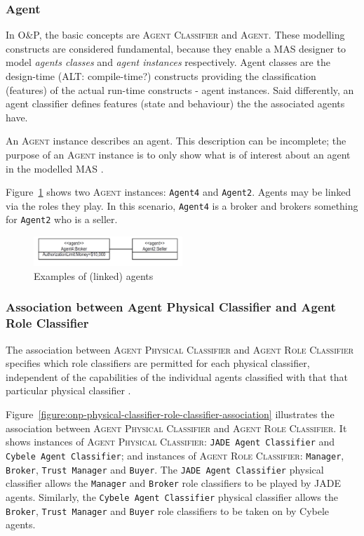 \subsubsection*{Agent}

In O\&P, the basic concepts are \textsc{Agent Classifier} and \textsc{Agent}.
These modelling constructs are considered fundamental, because they enable a MAS designer to model \textit{agents classes} and \textit{agent instances} respectively.
Agent classes are the design-time (ALT: compile-time?) constructs providing the classification (features) of the actual run-time constructs - agent instances.
Said differently, an agent classifier defines features (state and behaviour) the the associated agents have. 

An \textsc{Agent} instance describes an agent.
This description can be incomplete; the purpose of an \textsc{Agent} instance is to only show what is of interest about an agent in the modelled MAS \cite{Odell05}.

Figure~\ref{figure:onp-agent-examples} shows two \textsc{Agent} instances: \texttt{Agent4} and \texttt{Agent2}.
Agents may be linked via the roles they play.
In this scenario, \texttt{Agent4} is a broker and brokers something for \texttt{Agent2} who is a seller.

\begin{figure}[h]
	\centering
	\includegraphics[width=0.5\textwidth]{images/onp-agent-examples.png}
	\caption{Examples of (linked) agents}
	\label{figure:onp-agent-examples}
\end{figure}

\subsubsection*{Association between Agent Physical Classifier and Agent Role Classifier}

The association between \textsc{Agent Physical Classifier} and \textsc{Agent Role Classifier} specifies which role classifiers are permitted for each physical classifier, independent of the capabilities of the individual agents classified with that that particular physical classifier \cite{Odell05}.

Figure~\ref{figure:onp-physical-classifier-role-classifier-association} illustrates the association between \textsc{Agent Physical Classifier} and \textsc{Agent Role Classifier}. It shows instances of \textsc{Agent Physical Classifier}: \texttt{JADE Agent Classifier} and \texttt{Cybele Agent Classifier}; and instances of \textsc{Agent Role Classifier}: \texttt{Manager}, \texttt{Broker}, \texttt{Trust Manager} and \texttt{Buyer}.
The \texttt{JADE Agent Classifier} physical classifier allows the \texttt{Manager} and \texttt{Broker} role classifiers to be played by JADE agents.
Similarly, the \texttt{Cybele Agent Classifier} physical classifier allows the \texttt{Broker}, \texttt{Trust Manager} and \texttt{Buyer} role classifiers to be taken on by Cybele agents.

